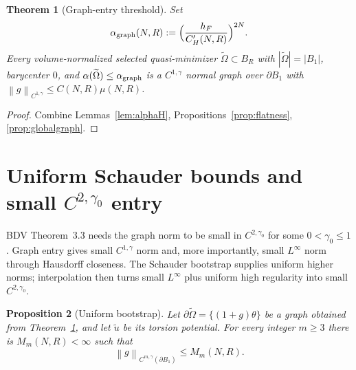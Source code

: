 \documentclass[11pt]{article}
\newtheorem{theorem}{Theorem}
\newtheorem{proposition}[theorem]{Proposition}
\theoremstyle{definition}
\newcommand{\norm}[1]{\left\|#1\right\|}
\newcommand{\abs}[1]{\left|#1\right|}
\begin{document}
\begin{theorem}[Graph-entry threshold]\label{thm:graphentry}
Set
\[
\alpha_{\rm graph}(N,R):=\Bigl(\frac{h_F}{C_H'(N,R)}\Bigr)^{2N}.
\]
Every volume-normalized selected quasi-minimizer $\widetilde\Omega\subset B_R$ with
$\abs{\widetilde\Omega}=\abs{B_1}$, barycenter $0$, and
\(
\alpha(\widetilde\Omega)\le\alpha_{\rm graph}
\)
is a $C^{1,\gamma}$ normal graph over $\partial B_1$ with
$\norm{g}_{C^{1,\gamma}}\le C(N,R)\mu(N,R)$.
\end{theorem}

\begin{proof}
Combine Lemmas~\ref{lem:alphaH}, Propositions~\ref{prop:flatness},
\ref{prop:globalgraph}.
\end{proof}

\section{Uniform Schauder bounds and small $C^{2,\gamma_0}$ entry}\label{sec:bootstrap}

BDV Theorem~3.3 needs the graph norm to be small in $C^{2,\gamma_0}$ for some
$0<\gamma_0\le1$. Graph entry gives small $C^{1,\gamma}$ norm and, more
importantly, small $L^\infty$ norm through Hausdorff closeness. The Schauder
bootstrap supplies uniform higher norms; interpolation then turns small
$L^\infty$ plus uniform high regularity into small $C^{2,\gamma_0}$.

\begin{proposition}[Uniform bootstrap]\label{prop:bootstrap}
Let $\partial\widetilde\Omega=\{(1+g)\theta\}$ be a graph obtained from
Theorem~\ref{thm:graphentry}, and let $\widetilde u$ be its torsion potential.
For every integer $m\ge3$ there is $M_m(N,R)<\infty$ such that
\[
\norm{g}_{C^{m,\gamma}(\partial B_1)}\le M_m(N,R).
\]
\end{proposition}
\end{document}
